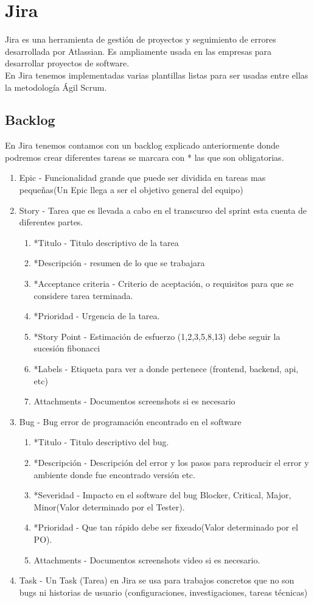 \section{Jira}
Jira es una herramienta de gestión de proyectos y seguimiento de errores desarrollada por Atlassian. Es ampliamente usada en las empresas para desarrollar proyectos de software.\\
En Jira tenemos implementadas varias plantillas listas para ser usadas entre ellas la metodología Ágil Scrum.
\\
\subsection{Backlog}
En Jira tenemos contamos con un backlog explicado anteriormente donde podremos crear  diferentes tareas se marcara con * las que son obligatorias.
\begin{enumerate}
  \item Epic - Funcionalidad grande que puede ser dividida en tareas mas pequeñas(Un Epic llega a ser el objetivo general del equipo)
  \item Story - Tarea que es llevada a cabo en el transcurso del sprint esta cuenta de diferentes partes.
    \begin{enumerate}
      \item *Titulo - Titulo descriptivo de la tarea
      \item *Descripción - resumen de lo que se trabajara
      \item *Acceptance criteria - Criterio de aceptación, o requisitos para que se considere tarea terminada.
      \item *Prioridad - Urgencia de la tarea.
      \item *Story Point - Estimación de esfuerzo (1,2,3,5,8,13) debe seguir la sucesión fibonacci
      \item *Labels - Etiqueta para ver a donde pertenece (frontend, backend, api, etc)
      \item Attachments - Documentos screenshots si es necesario
    \end{enumerate}
  \item Bug - Bug error de programación encontrado en el software
    \begin{enumerate}
      \item *Titulo - Titulo descriptivo del bug.
      \item *Descripción - Descripción del error y los pasos para reproducir el error y ambiente donde fue encontrado versión etc.
      \item *Severidad - Impacto en el software del bug Blocker, Critical, Major, Minor(Valor determinado por el Tester).
      \item *Prioridad - Que tan rápido debe ser fixeado(Valor determinado por el PO).
      \item Attachments - Documentos screenshots video si es necesario.
    \end{enumerate}
  \item Task - Un Task (Tarea) en Jira se usa para trabajos concretos que no son bugs ni historias de usuario (configuraciones, investigaciones, tareas técnicas)
\end{enumerate}
